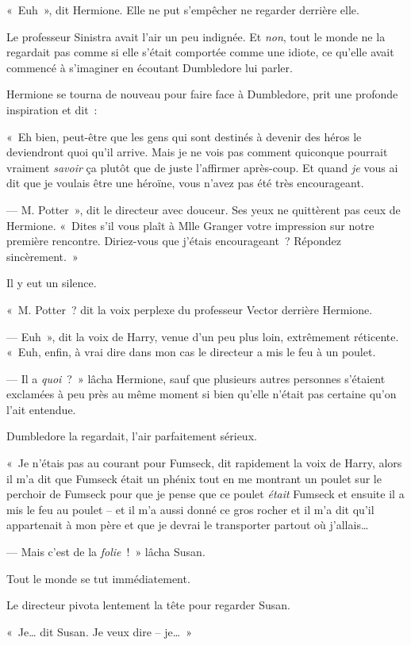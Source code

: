 «~Euh~», dit Hermione.
Elle ne put s'empêcher ne regarder derrière elle.

Le professeur Sinistra avait l'air un peu indignée.
Et \emph{non}, tout le monde ne la regardait pas comme si elle s'était comportée comme une idiote, ce qu'elle avait commencé à s'imaginer en écoutant Dumbledore lui parler.

Hermione se tourna de nouveau pour faire face à Dumbledore, prit une profonde inspiration et dit~:

«~Eh bien, peut-être que les gens qui sont destinés à devenir des héros le deviendront quoi qu'il arrive.
Mais je ne vois pas comment quiconque pourrait vraiment \emph{savoir} ça plutôt que de juste l'affirmer après-coup.
Et quand \emph{je} vous ai dit que je voulais être une héroïne, vous n'avez pas été très encourageant.

--- M. Potter~», dit le directeur avec douceur.
Ses yeux ne quittèrent pas ceux de Hermione.
«~Dites s'il vous plaît à Mlle Granger votre impression sur notre première rencontre.
Diriez-vous que j'étais encourageant~?
Répondez sincèrement.~»

Il y eut un silence.

«~M. Potter~? dit la voix perplexe du professeur Vector derrière Hermione.

--- Euh~», dit la voix de Harry, venue d'un peu plus loin, extrêmement réticente.
«~Euh, enfin, à vrai dire dans mon cas le directeur a mis le feu à un poulet.

--- Il a \emph{quoi}~?~»
lâcha Hermione, sauf que plusieurs autres personnes s'étaient exclamées à peu près au même moment si bien qu'elle n'était pas certaine qu'on l'ait entendue.

Dumbledore la regardait, l'air parfaitement sérieux.

«~Je n'étais pas au courant pour Fumseck, dit rapidement la voix de Harry, alors il m'a dit que Fumseck était un phénix tout en me montrant un poulet sur le perchoir de Fumseck pour que je pense que ce poulet \emph{était} Fumseck et ensuite il a mis le feu au poulet -- et il m'a aussi donné ce gros rocher et il m'a dit qu'il appartenait à mon père et que je devrai le transporter partout où j'allais…

--- Mais c'est de la \emph{folie}~!~»
lâcha Susan.

Tout le monde se tut immédiatement.

Le directeur pivota lentement la tête pour regarder Susan.

«~Je… dit Susan.
Je veux dire -- je…~»

